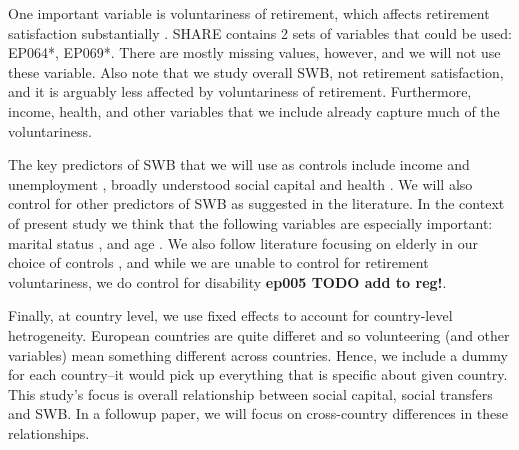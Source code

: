 \documentclass[10pt, letterpaper]{article}
\begin{document}
\begin{spacing}{1.4}
One important variable is voluntariness of retirement, which
affects retirement satisfaction substantially \citep{bender12}.  SHARE
contains 2 sets of variables that could be used: EP064*, EP069*.
There are mostly missing values, however, and we will not use these variable. Also note that  we study
overall SWB, not retirement satisfaction, and it is arguably less affected by
voluntariness of retirement. Furthermore, income, health, and other variables that we
include already capture much of the voluntariness.


The key predictors of SWB that we will use as controls include income and
unemployment \citep[][]{ditella01moa,ditella01mob,ditella06m}, broadly
understood social
capital and health \citep{blanchflower11,dolan08al,bonsang12}. %
We will also control for other predictors of SWB as suggested in the 
literature. In the context of present study we think that the following
variables are especially important: marital status \citep[e.g.,][]{myers00,diener04s}, and age \citep{ferring10}. 
%
We also follow literature focusing on elderly in our choice of controls
\citep[e.g.,][]{meier2008volunteering,bonsang12,bender12,ferring10}, and while
we are unable to control for retirement voluntariness, we do control for
disability \textbf{ep005 TODO add to reg!}.

Finally, at country level, we use fixed effects to account for country-level
hetrogeneity.
European countries are quite differet and so volunteering (and other variables) mean something
different across countries.  Hence, we include a dummy for each country--it would pick up
everything that is specific about given country. This study's focus is overall
relationship between social capital, social transfers and SWB. In a followup
paper, we will focus on cross-country differences in these relationships. 



\end{spacing}
\end{document}
